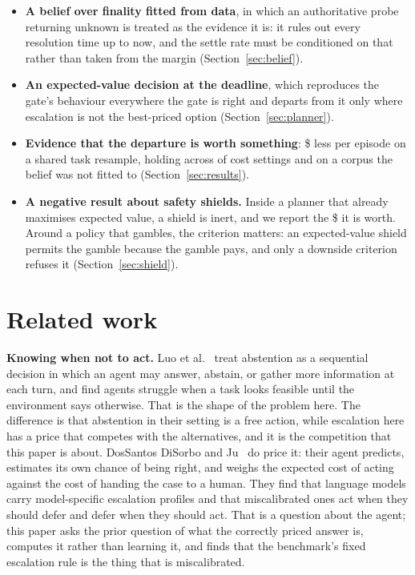 \documentclass[conference]{IEEEtran}
\begin{document}
\begin{itemize}
\item \textbf{A belief over finality fitted from data}, in which an
authoritative probe returning unknown is treated as the evidence it is: it rules
out every resolution time up to now, and the settle rate must be conditioned on
that rather than taken from the margin (Section~\ref{sec:belief}).

\item \textbf{An expected-value decision at the deadline}, which reproduces the
gate's behaviour everywhere the gate is right and departs from it only where
escalation is not the best-priced option (Section~\ref{sec:planner}).

\item \textbf{Evidence that the departure is worth something}:
\$\vsGateReduction{} less per episode on a shared task resample, holding across
\costPlannerBetter{} of
\costSettings{} cost settings and on a corpus the belief was not fitted to
(Section~\ref{sec:results}).

\item \textbf{A negative result about safety shields.} Inside a planner that
already maximises expected value, a shield is inert, and we report the
\$\ablShield{} it is worth. Around a policy that gambles, the criterion matters:
an expected-value shield permits the gamble because the gamble pays, and only a
downside criterion refuses it (Section~\ref{sec:shield}).
\end{itemize}

\section{Related work}

\textbf{Knowing when not to act.} Luo et al.~\cite{abstention} treat abstention
as a sequential decision in which an agent may answer, abstain, or gather more
information at each turn, and find agents struggle when a task looks feasible
until the environment says otherwise. That is the shape of the problem here.
The difference is that abstention in their setting is a free action, while
escalation here has a price that competes with the alternatives, and it is the
competition that this paper is about. DosSantos DiSorbo and
Ju~\cite{actorescalate} do price it: their agent predicts, estimates its own
chance of being right, and weighs the expected cost of acting against the cost
of handing the case to a human. They find that language models carry
model-specific escalation profiles and that miscalibrated ones act when they
should defer and defer when they should act. That is a question about the
agent; this paper asks the prior question of what the correctly priced answer
is, computes it rather than learning it, and finds that the benchmark's fixed
escalation rule is the thing that is miscalibrated.
\end{document}
